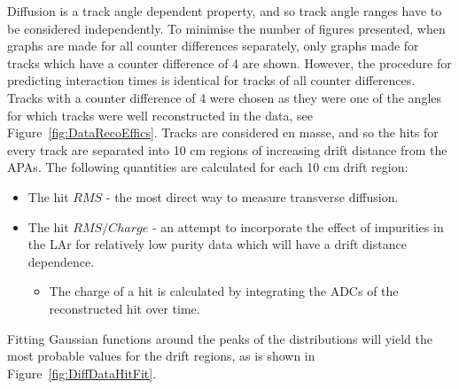 Diffusion is a track angle dependent property, and so track angle ranges have to be considered independently. To minimise the number of figures presented, when graphs are made for all counter differences separately, only graphs made for tracks which have a counter difference of 4 are shown. However, the procedure for predicting interaction times is identical for tracks of all counter differences. Tracks with a counter difference of 4 were chosen as they were one of the angles for which tracks were well reconstructed in the data, see Figure~\ref{fig:DataRecoEffics}. Tracks are considered en masse, and so the hits for every track are separated into 10 cm regions of increasing drift distance from the APAs. The following quantities are calculated for each 10 cm drift region:
\begin{itemize}
\item The hit $RMS$ - the most direct way to measure transverse diffusion.
\item The hit $RMS/Charge$ - an attempt to incorporate the effect of impurities in the LAr for relatively low purity data which will have a drift distance dependence.
  \begin{itemize}
  \item The charge of a hit is calculated by integrating the ADCs of the reconstructed hit over time. 
  \end{itemize}
\end{itemize}
Fitting Gaussian functions around the peaks of the distributions will yield the most probable values for the drift regions, as is shown in Figure~\ref{fig:DiffDataHitFit}. \\

